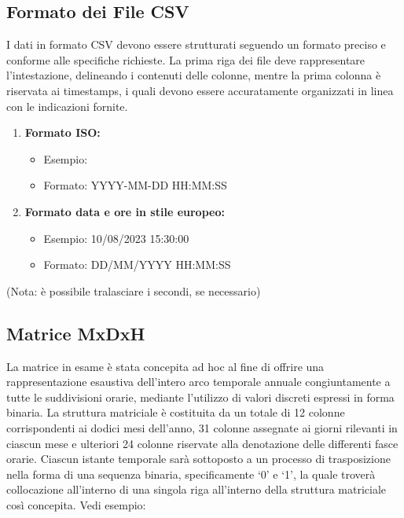 \documentclass[a4paper,10pt]{article}
\begin{document}
\subsection{Formato dei File CSV}

I dati in formato CSV devono essere strutturati seguendo un formato preciso e conforme alle specifiche richieste. 
La prima riga dei file deve rappresentare l'intestazione, delineando i contenuti delle colonne, mentre la prima colonna è riservata ai timestamps, 
i quali devono essere accuratamente organizzati in linea con le indicazioni fornite.
\begin{enumerate} 
  \item \textbf{Formato ISO:}
  \begin{itemize}
    \item Esempio:  
    \item Formato: YYYY-MM-DD HH:MM:SS
  \end{itemize}
  \item \textbf{Formato data e ore in stile europeo:}
  \begin{itemize}
    \item Esempio: 10/08/2023 15:30:00
    \item Formato: DD/MM/YYYY HH:MM:SS
  \end{itemize} 
\end{enumerate}

(Nota: è possibile tralasciare i secondi, se necessario)

\subsection{Matrice MxDxH}

La matrice in esame è stata concepita ad hoc al fine di offrire una rappresentazione esaustiva dell'intero arco 
temporale annuale congiuntamente a tutte le suddivisioni orarie, mediante l'utilizzo di valori discreti espressi in forma binaria. 
La struttura matriciale è costituita da un totale di 12 colonne corrispondenti ai dodici mesi dell'anno, 31 colonne assegnate 
ai giorni rilevanti in ciascun mese e ulteriori 24 colonne riservate alla denotazione delle differenti fasce orarie. 
Ciascun istante temporale sarà sottoposto a un processo di trasposizione nella forma di una sequenza binaria, specificamente `0' e `1', 
la quale troverà collocazione all'interno di una singola riga all'interno della struttura matriciale così concepita. Vedi esempio:
 
\end{document}
